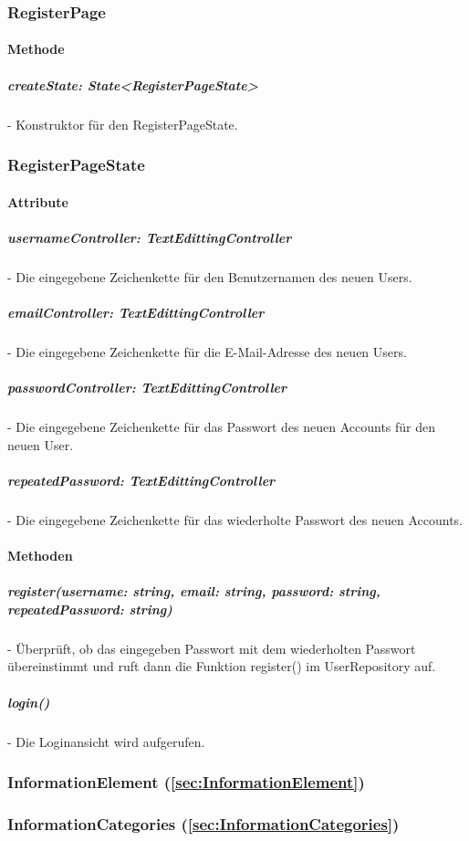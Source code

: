 \documentclass[parskip=full]{scrartcl}
\begin{document}
    \subsubsection{RegisterPage}
        \paragraph*{Methode}
            \subparagraph*{createState: State<RegisterPageState>} - Konstruktor für den RegisterPageState.
    
    \subsubsection{RegisterPageState}
        \paragraph*{Attribute}
            \subparagraph*{usernameController: TextEdittingController} - Die eingegebene Zeichenkette für den Benutzernamen des neuen Users.
            \subparagraph*{emailController: TextEdittingController} - Die eingegebene Zeichenkette für die E-Mail-Adresse des neuen Users.
            \subparagraph*{passwordController: TextEdittingController} - Die eingegebene Zeichenkette für das Passwort des neuen Accounts für den neuen User.
            \subparagraph*{repeatedPassword: TextEdittingController} - Die eingegebene Zeichenkette für das wiederholte Passwort des neuen Accounts.
         
        \paragraph*{Methoden}
            \subparagraph*{register(username: string, email: string, password: string, repeatedPassword: string)} - Überprüft, ob das eingegeben Passwort mit dem wiederholten Passwort übereinstimmt und ruft dann die Funktion register() im UserRepository auf.
            \subparagraph*{login()} - Die Loginansicht wird aufgerufen.

    \subsubsection*{InformationElement (\autoref{sec:InformationElement})}

    \subsubsection{InformationCategories (\autoref{sec:InformationCategories})}
\end{document}
